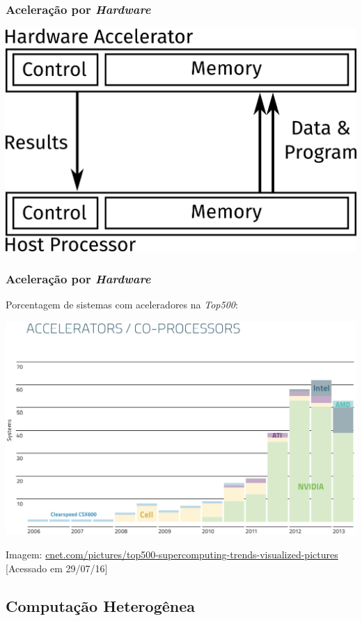 \documentclass[10pt, compress]{beamer}
\begin{document}
\begin{frame}
    \frametitle{Aceleração por \textit{Hardware}}
    \centering
    \includegraphics[width=.8\textwidth]{accel}
\end{frame}

\begin{frame}
    \frametitle{Aceleração por \textit{Hardware}}
    Porcentagem de sistemas com aceleradores na \textit{Top500}:

    \begin{center}
    \includegraphics[width=.85\textwidth]{top500_accel}
    \hfill

    \tiny{Imagem: \url{cnet.com/pictures/top500-supercomputing-trends-visualized-pictures} [Acessado em 29/07/16]}
    \end{center}
\end{frame}

\subsection{Computação Heterogênea}
\end{document}
